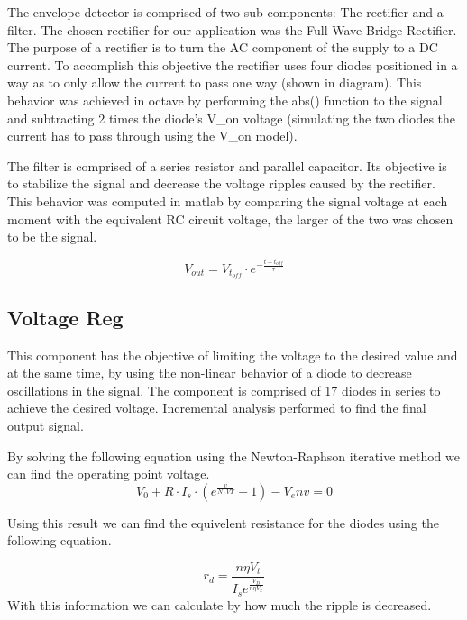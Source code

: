The envelope detector is comprised of two sub-components: The rectifier and a filter.
The chosen rectifier for our application was the Full-Wave Bridge Rectifier. The purpose of a rectifier is to turn the AC component of the supply to a DC current. To accomplish this objective the rectifier uses four diodes positioned in a way as to only allow the current to pass one way (shown in diagram).
This behavior was achieved in octave by performing the abs() function to the signal and subtracting 2 times the diode’s V_on voltage (simulating the two diodes the current has to pass through using the V_on model).

The filter is comprised of a series resistor and parallel capacitor. Its objective is to stabilize the signal and decrease the voltage ripples caused by the rectifier. This behavior was computed in matlab by comparing the signal voltage at each moment with the equivalent RC circuit voltage, the larger of the two was chosen to be the signal.

\[
V_{out}=V_{t_{off}}\cdot{}e^{-\frac{t-t_{off}}{\tau}}
\]


\subsection{Voltage Reg}
\label{subsec:voltreg}

This component has the objective of limiting the voltage to the desired value and at the same time, by using the non-linear behavior of a diode to decrease oscillations in the signal.
The component is comprised of 17 diodes in series to achieve the desired voltage.
Incremental analysis performed to find the final output signal.

By solving the following equation using the Newton-Raphson iterative method we can find the operating point voltage.
\[
V_0 + R\cdot I_s \cdot (e^{\frac{v}{N\cdot VT}}-1)-V_env = 0
\]

Using this result we can find the equivelent resistance for the diodes using the following equation.

\[
r_d=\frac{n\eta V_t}{I_se^{\frac{V_D}{n\eta V_x}}}
\]
With this information we can calculate by how much the ripple is decreased.

